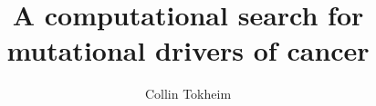 \documentclass[12pt,oneside,final]{thesis}
\theoremstyle{definition}
\theoremstyle{remark}
\theoremstyle{remark}
\begin{document}
\title{A computational search for mutational drivers of cancer}
\author{Collin Tokheim}
\dissertation
\doctorphilosophy
\copyrightnotice












\appendix








\end{document}
